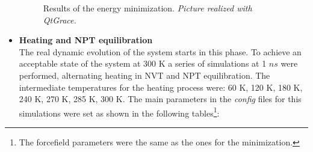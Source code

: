 \begin{itemize}
\begin{figure}[H]
\begin{minipage}[t]{0.775\textwidth}
    \footnotesize{\caption{Results of the energy minimization. \textit{Picture realized with QtGrace.}}
    \label{fig:energy-min}
    }
\end{minipage} 
\end{figure}


\item \textbf{Heating and NPT equilibration}\\
The real dynamic evolution of the system starts in this phase. To achieve an acceptable state of the system at 300 K a series of simulations at 1 $ns$ were performed, alternating heating in NVT and NPT equilibration. The intermediate temperatures for the heating process were: 60 K, 120 K, 180 K, 240 K, 270 K, 285 K, 300 K. The main parameters in the \textit{config} files for this simulations were set as shown in the following tables\footnote{The forcefield parameters were the same as the ones for the minimization.}:

\end{itemize}
